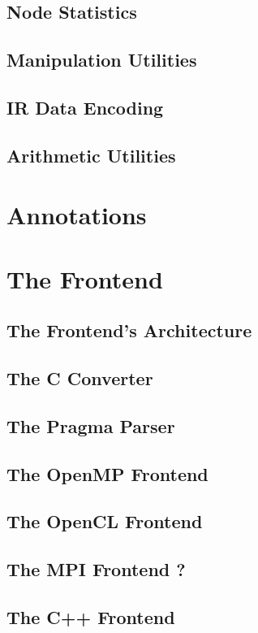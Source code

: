 \subsection{Node Statistics}
\label{sec:Compiler.Core.Statistics}
\subsection{Manipulation Utilities}
\label{sec:Compiler.Core.Manipulation}
\subsection{IR Data Encoding}
\label{sec:Compiler.Core.Encoding}
\subsection{Arithmetic Utilities}
\label{sec:Compiler.Core.Arithmetic}



\section{Annotations}

\section{The Frontend}
\subsection{The Frontend's Architecture}
\subsection{The C Converter}
\subsection{The Pragma Parser}
\subsection{The OpenMP Frontend}
\subsection{The OpenCL Frontend}
\subsection{The MPI Frontend ?}
\subsection{The C++ Frontend}
